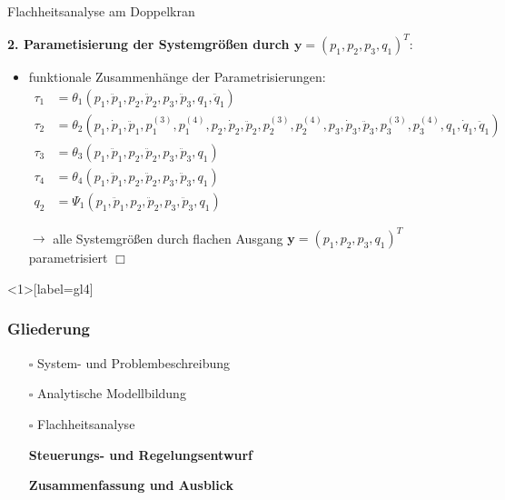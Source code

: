 \documentclass[
	ngerman,
	10pt,				%
	aspectratio=169, 	%
	xcolor=dvipsnames
]{beamer}
\newcommand{\cdbox}{$\square$\hspace{-0.65em}\raisebox{0.1em}{\checkmark}\hspace{-0.18em}}
\begin{document}
\begin{frame}[t,fragile,label=Flachheit_Doppelkran_2]{\large Flachheitsanalyse am Doppelkran}
	
	\textbf{2. Parametisierung der Systemgrößen durch $\mathbf{y} = (p_1, p_2, p_3, q_1)^T:$}
		
	\begin{itemize}
		\item funktionale Zusammenhänge der Parametrisierungen:
		\begin{align*}
			\tau_1 &= \theta_1 \left(p_1, \ddot{p}_1, p_2, \ddot{p}_2, p_3, \ddot{p}_3, q_1, \ddot{q}_1 \right) \\
			\tau_2 &= \theta_2 \left(p_1, \dot{p}_1, \ddot{p}_1, p_1^{(3)}, p_1^{(4)}, p_2, \dot{p}_2, \ddot{p}_2, p_2^{(3)}, p_2^{(4)}, p_3, \dot{p}_3, \ddot{p}_3, p_3^{(3)}, p_3^{(4)}, q_1, \dot{q}_1, \ddot{q}_1 \right) \\
			\tau_3 &= \theta_3 \left(p_1, \ddot{p}_1, p_2, \ddot{p}_2, p_3, \ddot{p}_3, q_1 \right) \\
			\tau_4 &= \theta_4 \left(p_1, \ddot{p}_1, p_2, \ddot{p}_2, p_3, \ddot{p}_3, q_1 \right) \\
			q_2 &= \Psi_1 \left(p_1, \ddot{p}_1, p_2, \ddot{p}_2, p_3, \ddot{p}_3, q_1 \right)
		\end{align*}
		\pause
		\item[$\rightarrow$] alle Systemgrößen durch flachen Ausgang $\mathbf{y} = (p_1, p_2, p_3, q_1)^T$ parametrisiert \quad $\Box$
	\end{itemize}
		
\end{frame}


\begin{frame}<1>[label=gl4]
	\frametitle{Gliederung}
	\begin{itemize}
		\item[\cdbox] System- und Problembeschreibung
		\item[\cdbox] Analytische Modellbildung
		\item[\cdbox] Flachheitsanalyse
		\item[\only<1>{$\rightarrow$}\only<2>{$\rightarrow$}\only<4->{\cdbox}]
		\textbf<1>{Steuerungs- und Regelungsentwurf}
		\item[\only<1-2>{$\square$}\only<3>{$\rightarrow$}\only<4->{\cdbox}]
		\textbf<3>{Zusammenfassung und Ausblick}
	\end{itemize}
\end{frame}
\end{document}

